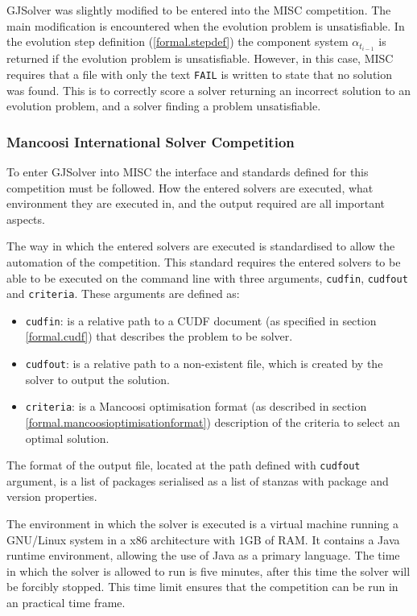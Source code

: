 GJSolver was slightly modified to be entered into the MISC competition.
The main modification is encountered when the evolution problem is unsatisfiable.
In the evolution step definition (\ref{formal.stepdef}) the component system $\alpha_{t_{i-1}}$ is returned if the evolution problem is unsatisfiable.
However, in this case, MISC requires that a file with only the text \texttt{FAIL} is written to state that no solution was found.
This is to correctly score a solver returning an incorrect solution to an evolution problem, 
and a solver finding a problem unsatisfiable.

\subsubsection{Mancoosi International Solver Competition}
\label{impl.MISCDEF}
To enter GJSolver into MISC the interface and standards defined for this competition must be followed.
How the entered solvers are executed, what environment they are executed in, and the output required are all important aspects.

The way in which the entered solvers are executed is standardised to allow the automation of the competition.
This standard requires the entered solvers to be able to be executed on the command line with three arguments, \verb+cudfin+, \verb+cudfout+ and \verb+criteria+.
These arguments are defined as:
\begin{itemize}
  \item \verb+cudfin+: is a relative path to a CUDF document (as specified in section \ref{formal.cudf}) that describes the problem to be solver.
  \item \verb+cudfout+: is a relative path to a non-existent file, which is created by the solver to output the solution.
  \item \verb+criteria+: is a Mancoosi optimisation format (as described in section \ref{formal.mancoosioptimisationformat}) description of the criteria to select an optimal solution. 
\end{itemize}
The format of the output file, located at the path defined with \verb+cudfout+ argument, is a list of packages serialised as a list of stanzas with package and version properties.

The environment in which the solver is executed is a virtual machine running a GNU/Linux system in a x86 architecture with 1GB of RAM.
It contains a Java runtime environment, allowing the use of Java as a primary language.
The time in which the solver is allowed to run is five minutes, after this time the solver will be forcibly stopped.
This time limit ensures that the competition can be run in an practical time frame.

